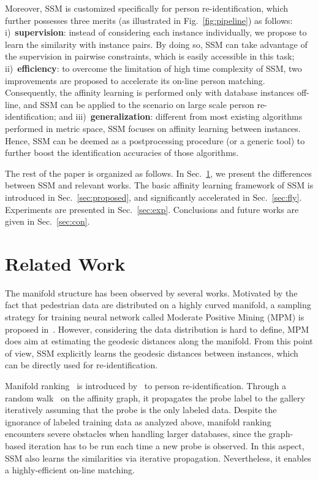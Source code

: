 \documentclass[10pt,twocolumn,letterpaper]{article}
\begin{document}
Moreover, SSM is customized specifically for person re-identification, which further possesses three merits (as illustrated in Fig.~\ref{fig:pipeline}) as follows:
i)~\textbf{supervision}: instead of considering each instance individually, we propose to learn the similarity with instance pairs. By doing so, SSM can take advantage of the supervision in pairwise constraints, which is easily accessible in this task;
ii)~\textbf{efficiency}: to overcome the limitation of high time complexity of SSM, two improvements are proposed to accelerate its on-line person matching. Consequently, the affinity learning is performed only with database instances off-line, and SSM can be applied to the scenario on large scale person re-identification;
and iii)~\textbf{generalization}: different from most existing algorithms performed in metric space, SSM focuses on affinity learning between instances. Hence, SSM can be deemed as a postprocessing procedure (or a generic tool) to further boost the identification accuracies of those algorithms.

The rest of the paper is organized as follows. In Sec.~\ref{sec:R_W}, we present the differences between SSM and relevant works. The basic affinity learning framework of SSM is introduced in Sec.~\ref{sec:proposed}, and significantly accelerated in Sec.~\ref{sec:fly}. Experiments are presented in Sec.~\ref{sec:exp}. Conclusions and future works are given in Sec.~\ref{sec:con}.

\section{Related Work} \label{sec:R_W}
The manifold structure has been observed by several works. Motivated by the fact that pedestrian data are distributed on a highly curved manifold, a sampling strategy for training neural network called Moderate Positive Mining (MPM) is proposed in~\cite{shi2016embedding}. However, considering the data distribution is hard to define, MPM does aim at estimating the geodesic distances along the manifold. From this point of view, SSM explicitly learns the geodesic distances between instances, which can be directly used for re-identification.

Manifold ranking~\cite{zhou2004ranking} is introduced by~\cite{person_manifold_ranking} to person re-identification. Through a random walk~\cite{random_walk} on the affinity graph, it propagates the probe label to the gallery iteratively assuming that the probe is the only labeled data. Despite the ignorance of labeled training data as analyzed above, manifold ranking encounters severe obstacles when handling larger databases, since the graph-based iteration has to be run each time a new probe is observed.
In this aspect, SSM also learns the similarities via iterative propagation. Nevertheless, it enables a highly-efficient on-line matching.
\end{document}
